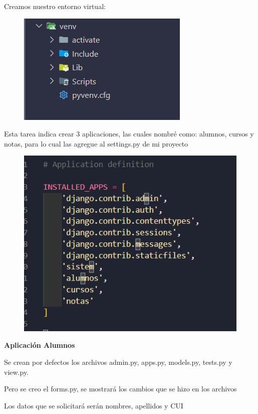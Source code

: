 \documentclass{article}
\begin{document}
\newpage

 \item Creamos nuestro entorno virtual:

    \begin{figure}[H]
           \centering
           \includegraphics[scale=0.7]{latex/img/img2.png}
     \end{figure}

 \item Esta tarea indica crear 3 aplicaciones, las cuales nombré como: alumnos, cursos y notas, para lo cual las agregue al settings.py de mi proyecto 
  
    \begin{figure}[H]
           \centering
           \includegraphics[scale=0.7]{latex/img/img4.png}
     \end{figure}

 
\textbf{\large Aplicación Alumnos}
 \item    Se crean por defectos los archivos admin.py, apps.py, models.py, tests.py y view.py. 
 \item    Pero se creo el forms.py, se mostrará los cambios que se hizo en los archivos
  \item  Los datos que se solicitará serán nombres, apellidos y CUI
 
\end{document}
